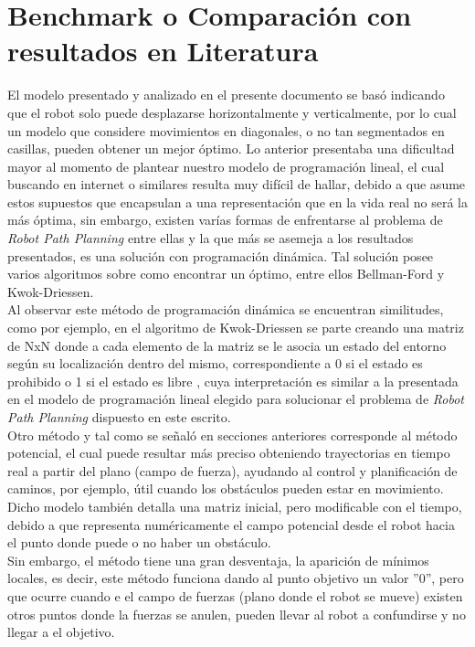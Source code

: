 \documentclass[journal, 10pt]{IEEEtran}
\begin{document}
\section{Benchmark o Comparación con resultados en Literatura}
El modelo presentado y analizado en el presente documento se basó indicando que el robot solo puede desplazarse horizontalmente y verticalmente, por lo cual un modelo que considere movimientos en diagonales, o no tan segmentados en casillas, pueden obtener un mejor óptimo. Lo anterior presentaba una dificultad mayor al momento de plantear nuestro modelo de programación lineal, el cual buscando en internet o similares resulta muy difícil de hallar, debido a que asume estos supuestos que encapsulan a una representación que en la vida real no será la más óptima, sin embargo, existen varías formas de enfrentarse al problema de \textit{Robot Path Planning} entre ellas y la que más se asemeja a los resultados presentados, es una solución con programación dinámica. Tal solución posee varios algoritmos sobre como encontrar un óptimo, entre ellos Bellman-Ford y Kwok-Driessen\cite{Dynamic:1957}.\\

Al observar este método de programación dinámica se encuentran similitudes, como por ejemplo, en el algoritmo de Kwok-Driessen se parte creando una matriz de NxN donde a cada elemento de la matriz se le asocia un estado del entorno según su  localización  dentro  del  mismo, correspondiente a 0 si el estado es prohibido o 1 si el estado es libre \cite{PlanificacionPD:2011}, cuya interpretación es similar a la presentada en el modelo de programación lineal elegido para solucionar el problema de \textit{Robot Path Planning} dispuesto en este escrito.\\

Otro método y tal como se señaló en secciones anteriores corresponde al método potencial, el cual puede resultar más preciso obteniendo trayectorias en tiempo real a partir del plano (campo de fuerza), ayudando al control y planificación de caminos, por ejemplo, útil cuando los obstáculos pueden estar en movimiento. Dicho modelo también detalla una matriz inicial, pero modificable con el tiempo, debido a que representa numéricamente el campo potencial desde el robot hacia el punto donde puede o no haber un obstáculo.\\

Sin embargo, el método tiene una gran desventaja, la aparición de mínimos locales, es decir, este método funciona dando al punto objetivo un valor ''0'', pero que ocurre cuando e el campo de fuerzas (plano donde el robot se mueve) existen otros puntos donde la fuerzas se anulen, pueden llevar al robot a confundirse y no llegar a el objetivo.\\
\end{document}
